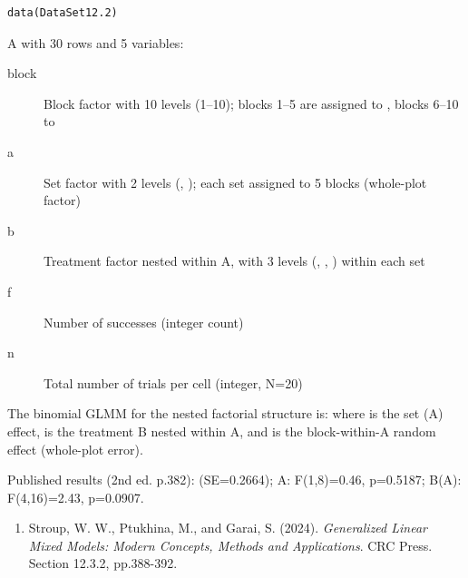 \documentclass[a4paper]{book}
\begin{document}
%
\begin{Usage}
\begin{verbatim}
data(DataSet12.2)
\end{verbatim}
\end{Usage}
%
\begin{Format}
A  with 30 rows and 5 variables:
\begin{description}

\item[block] Block factor with 10 levels (1–10); blocks 1–5 are
assigned to , blocks 6–10 to 
\item[a] Set factor with 2 levels (, );
each set assigned to 5 blocks (whole-plot factor)
\item[b] Treatment factor nested within A, with 3 levels
(, , ) within each set
\item[f] Number of successes (integer count)
\item[n] Total number of trials per cell (integer, N=20)

\end{description}

\end{Format}
%
\begin{Details}
The binomial GLMM for the nested factorial structure is:
where  is the set (A) effect,  is the
treatment B nested within A, and  is the block-within-A random effect
(whole-plot error).

Published results (2nd ed. p.382):
 (SE=0.2664); A: F(1,8)=0.46, p=0.5187;
B(A): F(4,16)=2.43, p=0.0907.
\end{Details}
%
\begin{References}
\begin{enumerate}

\item{} Stroup, W. W., Ptukhina, M., and Garai, S. (2024).
\emph{Generalized Linear Mixed Models: Modern Concepts,
Methods and Applications}. CRC Press. Section 12.3.2, pp.388-392.

\end{enumerate}

\end{References}
%
\begin{SeeAlso}
\end{SeeAlso}
\end{document}
